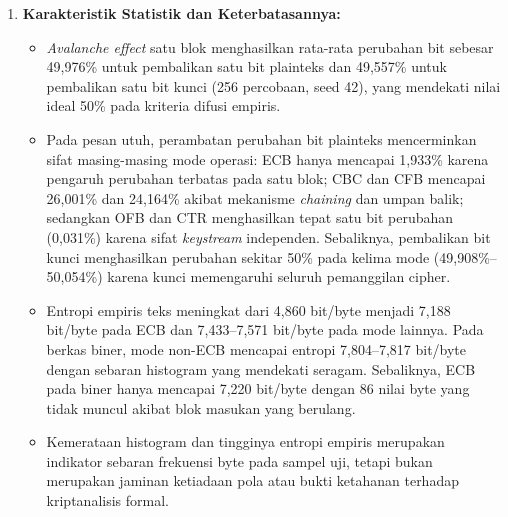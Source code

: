 \begin{enumerate}
  \item \textbf{Karakteristik Statistik dan Keterbatasannya:}
  \begin{itemize}
    \item \textit{Avalanche effect} satu blok menghasilkan rata-rata perubahan bit sebesar 49,976\% untuk pembalikan satu bit plainteks dan 49,557\% untuk pembalikan satu bit kunci (256 percobaan, seed 42), yang mendekati nilai ideal 50\% pada kriteria difusi empiris.
    \item Pada pesan utuh, perambatan perubahan bit plainteks mencerminkan sifat masing-masing mode operasi: ECB hanya mencapai 1,933\% karena pengaruh perubahan terbatas pada satu blok; CBC dan CFB mencapai 26,001\% dan 24,164\% akibat mekanisme \textit{chaining} dan umpan balik; sedangkan OFB dan CTR menghasilkan tepat satu bit perubahan (0,031\%) karena sifat \textit{keystream} independen. Sebaliknya, pembalikan bit kunci menghasilkan perubahan sekitar 50\% pada kelima mode (49,908\%--50,054\%) karena kunci memengaruhi seluruh pemanggilan cipher.
    \item Entropi empiris teks meningkat dari 4,860 bit/byte menjadi 7,188 bit/byte pada ECB dan 7,433--7,571 bit/byte pada mode lainnya. Pada berkas biner, mode non-ECB mencapai entropi 7,804--7,817 bit/byte dengan sebaran histogram yang mendekati seragam. Sebaliknya, ECB pada biner hanya mencapai 7,220 bit/byte dengan 86 nilai byte yang tidak muncul akibat blok masukan yang berulang.
    \item Kemerataan histogram dan tingginya entropi empiris merupakan indikator sebaran frekuensi byte pada sampel uji, tetapi bukan merupakan jaminan ketiadaan pola atau bukti ketahanan terhadap kriptanalisis formal.
  \end{itemize}
\end{enumerate}

